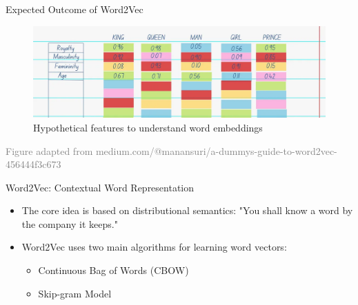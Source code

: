 \documentclass[serif, aspectratio=169]{beamer}
\begin{document}
\begin{frame}{Expected Outcome of Word2Vec}
	\begin{figure}
		\centering
		\includegraphics[width=1.0\textwidth]{pic/word2vec_expected.png}
		\caption*{Hypothetical features to understand word embeddings}
	\end{figure}
	\vspace{0.6cm}
	\hspace{-1.0cm}
	{\tiny \textcolor{gray}{Figure adapted from medium.com/@manansuri/a-dummys-guide-to-word2vec-456444f3c673}}
\end{frame}


%

\begin{frame}{Word2Vec: Contextual Word Representation}
    \begin{itemize}
        \item The core idea is based on distributional semantics: "You shall know a word by the company it keeps."
        \item Word2Vec uses two main algorithms for learning word vectors:
        \begin{itemize}
            \item Continuous Bag of Words (CBOW)
            \item Skip-gram Model
        \end{itemize}
    \end{itemize}
\end{frame}
\end{document}
